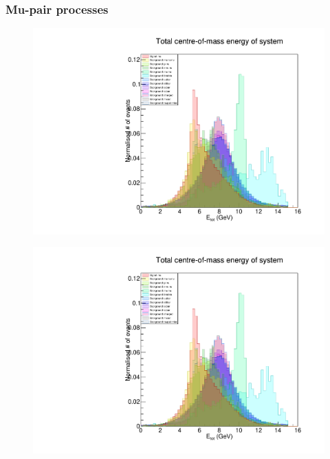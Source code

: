 \documentclass[12pt,a4paper]{article} %
\begin{document}
\subsubsection{Mu-pair processes}

\begin{figure}[h]
\centering
\begin{minipage}{.5\textwidth}
  \centering
  \includegraphics[width=\linewidth]{images/stack/stack_cut6_totalCM_E.pdf}
  \label{fig:test1}
\end{minipage}%
\begin{minipage}{.5\textwidth}
  \centering
  \includegraphics[width=\linewidth]{images/stack/stack_cut6_totalCM_E.pdf}
  \label{fig:test2}
\end{minipage}
\end{figure}
\end{document}
